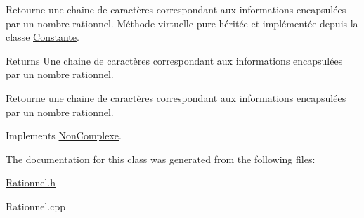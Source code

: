 \-Retourne une chaine de caractères correspondant aux informations encapsulées par un nombre rationnel. \-Méthode virtuelle pure héritée et implémentée depuis la classe \hyperlink{classConstante}{\-Constante}. 

\begin{DoxyReturn}{\-Returns}
\-Une chaine de caractères correspondant aux informations encapsulées par un nombre rationnel.
\end{DoxyReturn}
\-Retourne une chaine de caractères correspondant aux informations encapsulées par un nombre rationnel. 

\-Implements \hyperlink{classNonComplexe_abae1947a8f9f582f94d5e791ce4624d6}{\-Non\-Complexe}.



\-The documentation for this class was generated from the following files\-:\begin{DoxyCompactItemize}
\item 
\hyperlink{Rationnel_8h}{\-Rationnel.\-h}\item 
\-Rationnel.\-cpp\end{DoxyCompactItemize}
